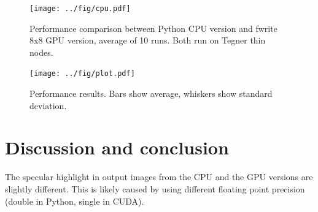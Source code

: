 \documentclass{article}
\begin{document}
\begin{figure}
    \centering
    \texttt{[image: ../fig/cpu.pdf]}
    \caption{Performance comparison between Python CPU version and fwrite 8x8
    GPU version, average of 10 runs. Both run on Tegner thin nodes.}
    \label{fig:cpu}
\end{figure}

\begin{figure}
    \centering
    \texttt{[image: ../fig/plot.pdf]}
    \caption{Performance results. Bars show average, whiskers show
    standard deviation.}
\end{figure}

\section{Discussion and conclusion}

The specular highlight in output images from the CPU and the GPU versions are
slightly different. This is likely caused by using different floating
point precision (double in Python, single in CUDA).
\end{document}
